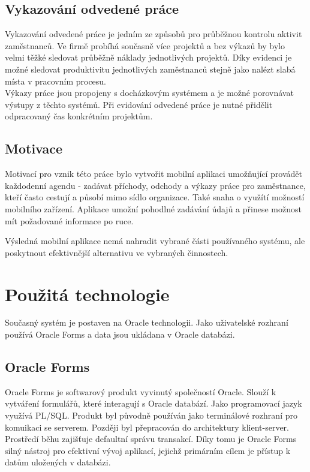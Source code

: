 \documentclass{diplomka}
\begin{document}
\subsection{Vykazování odvedené práce}
Vykazování odvedené práce je jedním ze způsobů pro průběžnou kontrolu aktivit zaměstnanců. Ve firmě probíhá současně více projektů a bez výkazů by bylo velmi těžké sledovat průběžně náklady jednotlivých projektů. 
Díky evidenci je možné sledovat produktivitu jednotlivých zaměstnanců stejně jako nalézt slabá místa v pracovním procesu.
\\ \indent Výkazy práce jsou propojeny s docházkovým systémem a je možné porovnávat výstupy z těchto systémů. Při evidování odvedené práce je nutné přidělit odpracovaný čas konkrétním projektům. 

\subsection{Motivace}
Motivací pro vznik této práce bylo vytvořit mobilní aplikaci umožňující provádět každodenní agendu - zadávat příchody, odchody a výkazy práce pro zaměstnance, kteří často cestují a působí mimo sídlo organizace. Také snaha o využítí možností mobilního zařízení. Aplikace umožní pohodlné zadávání údajů a přinese možnost mít požadované informace po ruce.

Výsledná mobilní aplikace nemá nahradit vybrané části používaného systému, ale poskytnout efektivnější alternativu ve vybraných činnostech.


\section{Použitá technologie}
Současný systém je postaven na Oracle technologii. Jako uživatelské rozhraní používá Oracle Forms a data jsou ukládana v Oracle databázi.
 
\subsection{Oracle Forms}
Oracle Forms\cite{forms} je softwarový produkt vyvinutý společností Oracle. Slouží k vytváření formulářů, které interagují s Oracle databází. Jako programovací jazyk využívá PL/SQL. Produkt byl původně používán jako terminálové rozhraní pro komuikaci se serverem. Později byl přepracován do architektury klient-server.\\ \indent
Prostředí běhu zajišťuje defaultní správu transakcí. Díky tomu je Oracle Forms silný nástroj pro efektivní vývoj aplikací, jejichž primárním cílem je přístup k datům uložených v databázi. 
\end{document}
